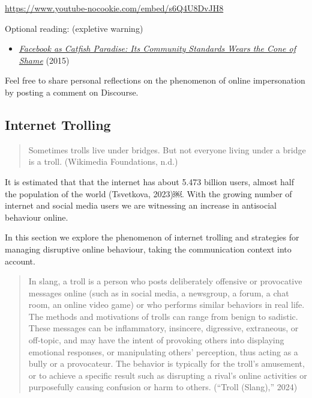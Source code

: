 \documentclass[
  letterpaper,
  DIV=11,
  numbers=noendperiod]{scrreprt}
\providecommand{\tightlist}{%
  \setlength{\itemsep}{0pt}\setlength{\parskip}{0pt}}\usepackage{longtable,booktabs,array}
\begin{document}
\begin{tcolorbox}
\url{https://www.youtube-nocookie.com/embed/s6Q4U8DvJH8}

Optional reading: (expletive warning)

\begin{itemize}
\tightlist
\item
  \href{https://cogdogblog.com/2015/10/facebook-as-catfish-paradise-its-community-standards-wears-the-cone-of-shame/}{\emph{Facebook
  as Catfish Paradise: Its Community Standards Wears the Cone of Shame}}
  (2015)
\end{itemize}

Feel free to share personal reflections on the phenomenon of online
impersonation by posting a comment on Discourse.

\end{tcolorbox}

\subsection*{Internet Trolling}\label{internet-trolling}

\begin{quote}
Sometimes trolls live under bridges. But not everyone living under a
bridge is a troll. (Wikimedia Foundations, n.d.)
\end{quote}

It is estimated that that the internet has about 5.473 billion users,
almost half the population of the world (Tsvetkova, 2023)￼. With the
growing number of internet and social media users we are witnessing an
increase in antisocial behaviour online.

In this section we explore the phenomenon of internet trolling and
strategies for managing disruptive online behaviour, taking the
communication context into account.

\begin{quote}
In slang, a troll is a person who posts deliberately offensive or
provocative messages online (such as in social media, a newsgroup, a
forum, a chat room, an online video game) or who performs similar
behaviors in real life. The methods and motivations of trolls can range
from benign to sadistic. These messages can be inflammatory, insincere,
digressive, extraneous, or off-topic, and may have the intent of
provoking others into displaying emotional responses, or manipulating
others' perception, thus acting as a bully or a provocateur. The
behavior is typically for the troll's amusement, or to achieve a
specific result such as disrupting a rival's online activities or
purposefully causing confusion or harm to others. (``Troll (Slang),''
2024)
\end{quote}
\end{document}
